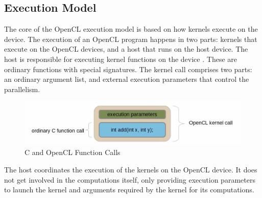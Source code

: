  \subsection{Execution Model}
 \label{sect4_1_3}
The core of the OpenCL execution model is based on how kernels execute on the device. The execution of an OpenCL program happens in two parts: kernels that execute on the OpenCL devices, and a host that runs on the host device. The host is responsible for executing kernel functions on the device \cite{opencl_khronos}. These are ordinary functions with special signatures. The kernel call comprises two parts: an ordinary argument list, and external execution parameters that control the parallelism.\newline\newline
\begin{figure}[h!]
\centering
\includegraphics[width=\linewidth]{figures/C_and_OpenCL_Function_Calls.png}
\caption{C and OpenCL Function Calls \cite{opencl_ajg}}
\label{fig:opencl3}
\end{figure}
The host coordinates the execution of the kernels on the OpenCL device. It does not get involved in the computations itself, only providing execution parameters to launch the kernel and arguments required by the kernel for its computations. 

